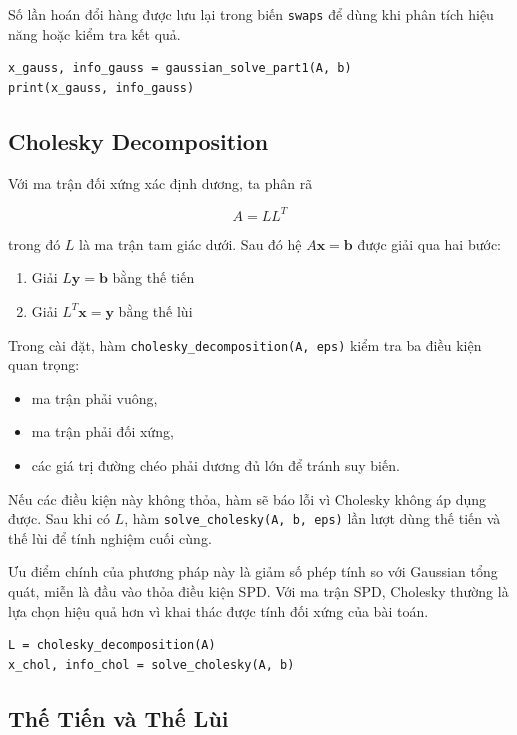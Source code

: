 \documentclass[12pt, a4paper, twoside]{article}
\begin{document}
Số lần hoán đổi hàng được lưu lại trong biến \texttt{swaps} để dùng khi phân tích hiệu năng hoặc kiểm tra kết quả.

\begin{lstlisting}
x_gauss, info_gauss = gaussian_solve_part1(A, b)
print(x_gauss, info_gauss)
\end{lstlisting}

\subsection{Cholesky Decomposition}

Với ma trận đối xứng xác định dương, ta phân rã

\[
A = LL^T
\]

trong đó $L$ là ma trận tam giác dưới. Sau đó hệ $A\mathbf{x} = \mathbf{b}$ được giải qua hai bước:
\begin{enumerate}
    \item Giải $L\mathbf{y} = \mathbf{b}$ bằng thế tiến
    \item Giải $L^T\mathbf{x} = \mathbf{y}$ bằng thế lùi
\end{enumerate}

Trong cài đặt, hàm \texttt{cholesky\_decomposition(A, eps)} kiểm tra ba điều kiện quan trọng:
\begin{itemize}
    \item ma trận phải vuông,
    \item ma trận phải đối xứng,
    \item các giá trị đường chéo phải dương đủ lớn để tránh suy biến.
\end{itemize}

Nếu các điều kiện này không thỏa, hàm sẽ báo lỗi vì Cholesky không áp dụng được. Sau khi có $L$, hàm \texttt{solve\_cholesky(A, b, eps)} lần lượt dùng thế tiến và thế lùi để tính nghiệm cuối cùng.

Ưu điểm chính của phương pháp này là giảm số phép tính so với Gaussian tổng quát, miễn là đầu vào thỏa điều kiện SPD. Với ma trận SPD, Cholesky thường là lựa chọn hiệu quả hơn vì khai thác được tính đối xứng của bài toán.

\begin{lstlisting}
L = cholesky_decomposition(A)
x_chol, info_chol = solve_cholesky(A, b)
\end{lstlisting}

\subsection{Thế Tiến và Thế Lùi}
\end{document}
